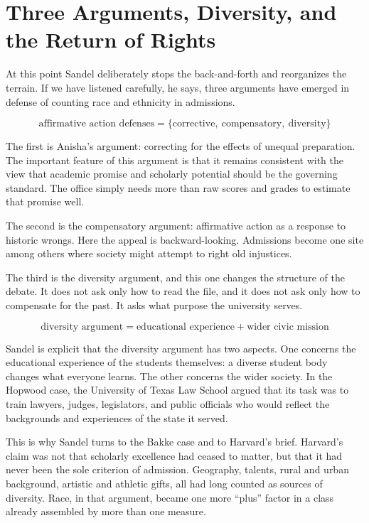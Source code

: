 \section{Three Arguments, Diversity, and the Return of Rights}

At this point Sandel deliberately stops the back-and-forth and reorganizes the terrain. If we have listened carefully, he says, three arguments have emerged in defense of counting race and ethnicity in admissions.

\begin{equation}
\text{affirmative action defenses}
=
\{\text{corrective},\ \text{compensatory},\ \text{diversity}\}
\end{equation}

The first is Anisha's argument: correcting for the effects of unequal preparation. The important feature of this argument is that it remains consistent with the view that academic promise and scholarly potential should be the governing standard. The office simply needs more than raw scores and grades to estimate that promise well.

The second is the compensatory argument: affirmative action as a response to historic wrongs. Here the appeal is backward-looking. Admissions become one site among others where society might attempt to right old injustices.

The third is the diversity argument, and this one changes the structure of the debate. It does not ask only how to read the file, and it does not ask only how to compensate for the past. It asks what purpose the university serves.

\begin{equation}
\text{diversity argument}
=
\text{educational experience} + \text{wider civic mission}
\end{equation}

Sandel is explicit that the diversity argument has two aspects. One concerns the educational experience of the students themselves: a diverse student body changes what everyone learns. The other concerns the wider society. In the Hopwood case, the University of Texas Law School argued that its task was to train lawyers, judges, legislators, and public officials who would reflect the backgrounds and experiences of the state it served.

This is why Sandel turns to the Bakke case and to Harvard's brief. Harvard's claim was not that scholarly excellence had ceased to matter, but that it had never been the sole criterion of admission. Geography, talents, rural and urban background, artistic and athletic gifts, all had long counted as sources of diversity. Race, in that argument, became one more ``plus'' factor in a class already assembled by more than one measure.

